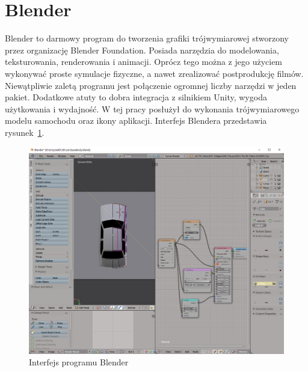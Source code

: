 \section*{Blender}
Blender to darmowy program do tworzenia grafiki trójwymiarowej stworzony przez organizację Blender Foundation. Posiada narzędzia do modelowania, teksturowania, renderowania i animacji. Oprócz tego można z jego użyciem wykonywać proste symulacje fizyczne, a nawet zrealizować postprodukcję filmów. Niewątpliwie zaletą programu jest połączenie ogromnej liczby narzędzi w jeden pakiet. Dodatkowe atuty to dobra integracja z silnikiem Unity, wygoda użytkowania i wydajność. W tej pracy posłużył do wykonania trójwymiarowego modelu samochodu oraz ikony aplikacji. Interfejs Blendera przedstawia rysunek~\ref{fig:blender}.
\begin{figure}[h!]
	\centering
	\includegraphics[width=1\linewidth]{blender}
	\caption[Interfejs programu Blender]{Interfejs programu Blender}
	\label{fig:blender}
\end{figure}

